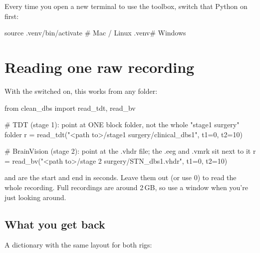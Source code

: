 Every time you open a new terminal to use the toolbox, switch that Python on first:
\begin{codebox}
source .venv/bin/activate        # Mac / Linux
.venv\Scripts\activate           # Windows
\end{codebox}

\section{Reading one raw recording}

With the  switched on, this works from any folder:
\begin{codebox}
from clean_dbs import read_tdt, read_bv

# TDT (stage 1): point at ONE block folder, not the whole "stage1 surgery" folder
r = read_tdt("<path to>/stage1 surgery/clinical_dbs1", t1=0, t2=10)

# BrainVision (stage 2): point at the .vhdr file; the .eeg and .vmrk sit next to it
r = read_bv("<path to>/stage 2 surgery/STN_dbs1.vhdr", t1=0, t2=10)
\end{codebox}
 and  are the start and end in seconds. Leave them out (or use 0) to read the whole recording. Full recordings are around 2\,GB, so use a window when you're just looking around.

\subsection{What you get back}
A dictionary with the same layout for both rigs:

